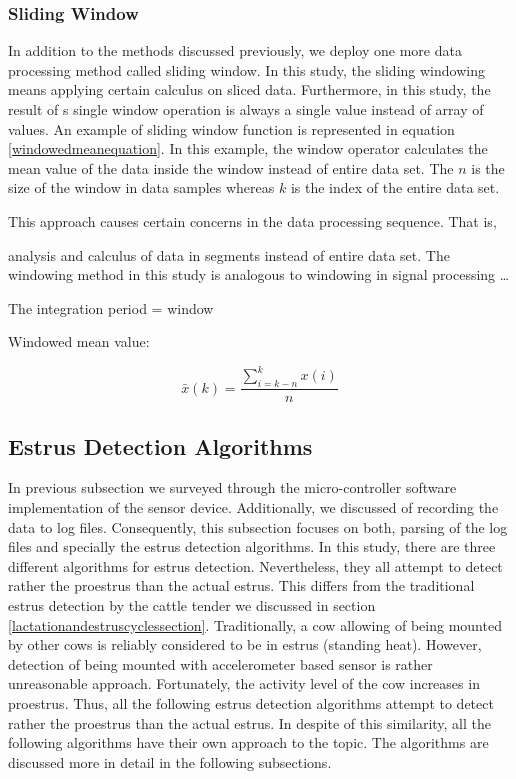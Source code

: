 \documentclass[english,12pt,a4paper,pdftex,elec,utf8]{aaltothesis}
\begin{document}

\subsubsection{Sliding Window} \label{slidingwindowsection}

In addition to the methods discussed previously, we deploy one more data processing method called sliding window. In this study, the sliding windowing means applying certain calculus on sliced data. Furthermore, in this study, the result of s single window operation is always a single value instead of array of values. An example of sliding window function is represented in equation \ref{windowedmeanequation}. In this example, the window operator calculates the mean value of the data inside the window instead of entire data set. The $n$ is the size of the window in data samples whereas $k$ is the index of the entire data set. 

 This approach causes certain concerns in the data processing sequence. That is, 

 analysis and calculus of data in segments instead of entire data set. The windowing method in this study is analogous to windowing in signal processing \cite{tan2007digital,miao2007signal} \dots 

The integration period = window

Windowed mean value:

\begin{equation} \label{windowedmeanequation}
\bar{x}(k) = \frac{ \sum\limits^{k}_{i = k - n} x(i)}{n}
\end{equation} 


\subsection{Estrus Detection Algorithms} \label{estrusdetectionalgorithmssection}

In previous subsection we surveyed through the micro-controller software implementation of the sensor device. Additionally, we discussed of recording the data to log files. Consequently, this subsection focuses on both, parsing of the log files and specially the estrus detection algorithms. In this study, there are three different algorithms for estrus detection. Nevertheless, they all attempt to detect rather the proestrus than the actual estrus. This differs from the traditional estrus detection by the cattle tender we discussed in section \ref{lactationandestruscyclessection}. Traditionally, a cow allowing of being mounted by other cows is reliably considered to be in estrus (standing heat). However, detection of being mounted with accelerometer based sensor is rather unreasonable approach. Fortunately, the activity level of the cow increases in proestrus. Thus, all the following estrus detection algorithms attempt to detect rather the proestrus than the actual estrus. In despite of this similarity, all the following algorithms have their own approach to the topic. The algorithms are discussed more in detail in the following subsections.  
\end{document}
